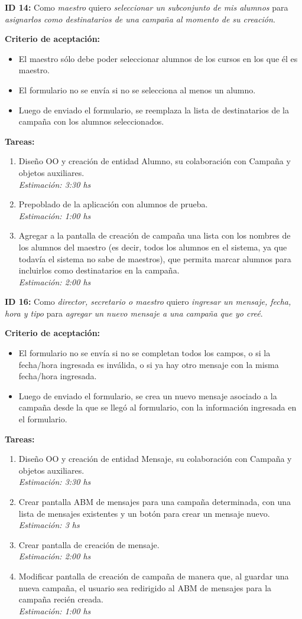 \documentclass[a4paper, 10pt, twoside]{article}
\newcommand{\sprintstory}[4]{
  \noindent
  \textbf{ID #1:} Como \emph{#2} quiero \emph{#3} para \emph{#4}.
}
\newenvironment{criterios}{
  \textbf{Criterio de aceptación:}
  \begin{itemize}
}{
  \end{itemize}
}
\newcommand{\criterio}[1] {
  \item #1
}
\newenvironment{tasks}{
  \textbf{Tareas:}
  \begin{enumerate}
}{
  \end{enumerate}
}
\newcommand{\task}[2] {
  \item #1.\\
  \emph{Estimación: #2 hs}
}
\begin{document}
\sprintstory{14}
            {maestro}
            {seleccionar un subconjunto de mis alumnos}
            {asignarlos como destinatarios de una campaña al momento de su creación}

\begin{criterios}
  \criterio{El maestro sólo debe poder seleccionar alumnos de los cursos en los que él es maestro.}
  \criterio{El formulario no se envía si no se selecciona al menos un alumno.}
  \criterio{Luego de enviado el formulario, se reemplaza la lista de destinatarios de la campaña con los alumnos seleccionados.}
\end{criterios}

\begin{tasks}
  \task{Diseño OO y creación de entidad Alumno, su colaboración con Campaña y objetos auxiliares}{3:30}
  \task{Prepoblado de la aplicación con alumnos de prueba}{1:00}
  \task{Agregar a la pantalla de creación de campaña una lista con los nombres de los alumnos del maestro (es decir, todos los alumnos en el sistema, ya que todavía el sistema no sabe de maestros), que permita marcar alumnos para incluirlos como destinatarios en la campaña}{2:00}
\end{tasks}


\sprintstory{16}
            {director, secretario o maestro}
            {ingresar un mensaje, fecha, hora y tipo}
            {agregar un nuevo mensaje a una campaña que yo creé}

\begin{criterios}
  \criterio{El formulario no se envía si no se completan todos los campos, o si la fecha/hora ingresada es inválida, o si ya hay otro mensaje con la misma fecha/hora ingresada.}
  \criterio{Luego de enviado el formulario, se crea un nuevo mensaje asociado a la campaña desde la que se llegó al formulario, con la información ingresada en el formulario.}
\end{criterios}

\begin{tasks}
  \task{Diseño OO y creación de entidad Mensaje, su colaboración con Campaña y objetos auxiliares}{3:30}
  \task{Crear pantalla ABM de mensajes para una campaña determinada, con una lista de mensajes existentes y un botón para crear un mensaje nuevo}{3}
  \task{Crear pantalla de creación de mensaje}{2:00}
  \task{Modificar pantalla de creación de campaña de manera que, al guardar una nueva campaña, el usuario sea redirigido al ABM de mensajes para la campaña recién creada}{1:00}
\end{tasks}
\end{document}
